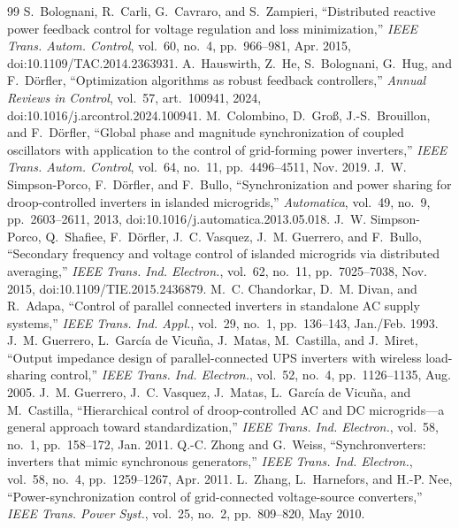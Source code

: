 \documentclass[11pt,a4paper]{scrartcl}
\begin{document}
\begin{onehalfspace}
\begin{thebibliography}{99}
	 S.~Bolognani, R.~Carli, G.~Cavraro, and S.~Zampieri, ``Distributed reactive power feedback control for voltage regulation and loss minimization,'' \emph{IEEE Trans. Autom. Control}, vol.~60, no.~4, pp.~966--981, Apr. 2015, doi:10.1109/TAC.2014.2363931.
	 A.~Hauswirth, Z.~He, S.~Bolognani, G.~Hug, and F.~D\"orfler, ``Optimization algorithms as robust feedback controllers,'' \emph{Annual Reviews in Control}, vol.~57, art.~100941, 2024, doi:10.1016/j.arcontrol.2024.100941.
	 M.~Colombino, D.~Gro\ss, J.-S.~Brouillon, and F.~D\"orfler, ``Global phase and magnitude synchronization of coupled oscillators with application to the control of grid-forming power inverters,'' \emph{IEEE Trans. Autom. Control}, vol.~64, no.~11, pp.~4496--4511, Nov. 2019.
	 J.~W. Simpson-Porco, F.~D\"orfler, and F.~Bullo, ``Synchronization and power sharing for droop-controlled inverters in islanded microgrids,'' \emph{Automatica}, vol.~49, no.~9, pp.~2603--2611, 2013, doi:10.1016/j.automatica.2013.05.018.
	 J.~W. Simpson-Porco, Q.~Shafiee, F.~D\"orfler, J.~C. Vasquez, J.~M. Guerrero, and F.~Bullo, ``Secondary frequency and voltage control of islanded microgrids via distributed averaging,'' \emph{IEEE Trans. Ind. Electron.}, vol.~62, no.~11, pp.~7025--7038, Nov. 2015, doi:10.1109/TIE.2015.2436879.
	 M.~C. Chandorkar, D.~M. Divan, and R.~Adapa, ``Control of parallel connected inverters in standalone AC supply systems,'' \emph{IEEE Trans. Ind. Appl.}, vol.~29, no.~1, pp.~136--143, Jan./Feb. 1993.
	 J.~M. Guerrero, L.~Garc\'ia de Vicu\~na, J.~Matas, M.~Castilla, and J.~Miret, ``Output impedance design of parallel-connected UPS inverters with wireless load-sharing control,'' \emph{IEEE Trans. Ind. Electron.}, vol.~52, no.~4, pp.~1126--1135, Aug. 2005.
	 J.~M. Guerrero, J.~C. Vasquez, J.~Matas, L.~Garc\'ia de Vicu\~na, and M.~Castilla, ``Hierarchical control of droop-controlled AC and DC microgrids---a general approach toward standardization,'' \emph{IEEE Trans. Ind. Electron.}, vol.~58, no.~1, pp.~158--172, Jan. 2011.
	 Q.-C. Zhong and G.~Weiss, ``Synchronverters: inverters that mimic synchronous generators,'' \emph{IEEE Trans. Ind. Electron.}, vol.~58, no.~4, pp.~1259--1267, Apr. 2011.
	 L.~Zhang, L.~Harnefors, and H.-P. Nee, ``Power-synchronization control of grid-connected voltage-source converters,'' \emph{IEEE Trans. Power Syst.}, vol.~25, no.~2, pp.~809--820, May 2010.

\end{thebibliography}
\end{onehalfspace}
\end{document}
